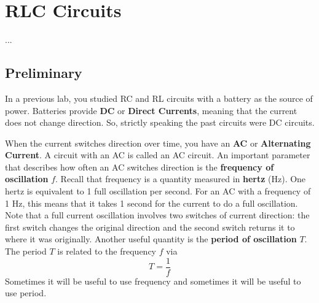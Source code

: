 \chapter{RLC Circuits}
...
\section{Preliminary}
In a previous lab, you studied RC and RL circuits with a battery as the source of power. Batteries provide \textbf{DC} or \textbf{Direct Currents}, meaning that the current does not change direction. So, strictly speaking the past circuits were DC circuits.

When the current switches direction over time, you have an \textbf{AC} or \textbf{Alternating Current}. A circuit with an AC is called an AC circuit. An important parameter that describes how often an AC switches direction is the \textbf{frequency of oscillation} $f$. Recall that frequency is a quantity measured in \textbf{hertz} (Hz). One hertz is equivalent to 1 full oscillation per second. For an AC with a frequency of 1 Hz, this means that it takes 1 second for the current to do a full oscillation. Note that a full current oscillation involves two switches of current direction: the first switch changes the original direction and the second switch returns it to where it was originally. Another useful quantity is the \textbf{period of oscillation} $T$. The period $T$ is related to the frequency $f$ via
\begin{equation} \label{eq.06.period}
	T = \frac{1}{f}
\end{equation}
Sometimes it will be useful to use frequency and sometimes it will be useful to use period.
